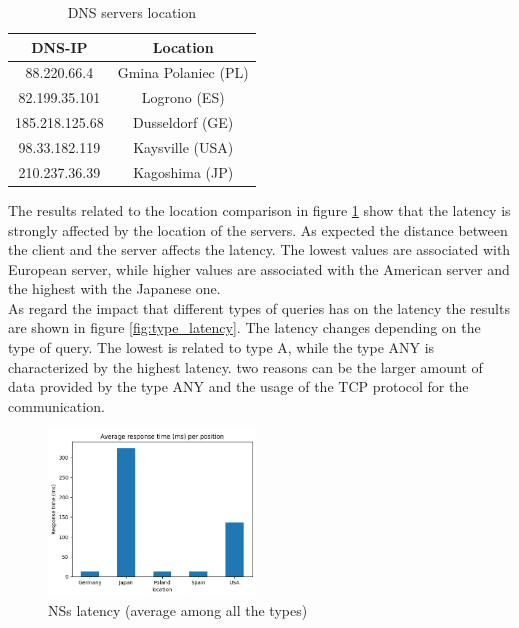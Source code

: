 \documentclass[a4paper,10pt]{article}
\begin{document}
\begin{multicols}{2}
        \begin{table}[H]
                \centering
                \caption{\small DNS servers location}
                \vspace{0.3cm}
                \begin{tabular}{|c|c|}
                \hline
                \textbf{DNS-IP} & \textbf{Location} \\ \hline
                88.220.66.4 & Gmina Polaniec (PL) \\ \hline
                82.199.35.101 & Logrono (ES) \\ \hline
                185.218.125.68 & Dusseldorf (GE) \\ \hline
                98.33.182.119 & Kaysville (USA) \\ \hline
                210.237.36.39 & Kagoshima (JP) \\ \hline
                \end{tabular}
                \label{tab:dns_location}
        \end{table}

\noindent
The results related to the location comparison in figure \ref{fig:location_latency} show that the latency is strongly affected by the location of the servers. As expected the distance between the
client and the server affects the latency. The lowest values are associated with European server, while higher values are associated with the American server and the highest with the Japanese one.\\
As regard the impact that different types of queries has on the latency the results are shown in figure \ref{fig:type_latency}. The latency changes depending on the type of query. The lowest is related
to type A, while the type ANY is characterized by the highest latency. two reasons can be the larger amount of data provided by the type ANY and the usage of the TCP protocol for the 
communication.\\

        \begin{figure}[H]
                \centering
                \includegraphics[width=0.49\textwidth]{location_latency.png}
                \caption{\small NSs latency (average among all the types)}
                \label{fig:location_latency}
        \end{figure}


\end{multicols}
\end{document}
